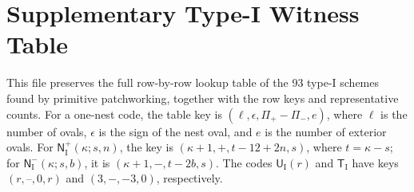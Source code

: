 \documentclass[10pt]{article}
\begin{document}
\raggedbottom
\section*{Supplementary Type-I Witness Table}
This file preserves the full row-by-row lookup table of the 93 type-I schemes found by primitive patchworking, together with the row keys and representative counts. For a one-nest code, the table key is $(\ell,\epsilon,\Pi_+-\Pi_-,e)$, where $\ell$ is the number of ovals, $\epsilon$ is the sign of the nest oval, and $e$ is the number of exterior ovals. For $\mathsf{N}_{\mathrm I}^{+}(\kappa;s,n)$, the key is $(\kappa+1,+,t-12+2n,s)$, where $t=\kappa-s$; for $\mathsf{N}_{\mathrm I}^{-}(\kappa;s,b)$, it is $(\kappa+1,-,t-2b,s)$. The codes $\mathsf U_{\mathrm I}(r)$ and $\mathsf T_{\mathrm I}$ have keys $(r,\text{--},0,r)$ and $(3,-,-3,0)$, respectively.
\small
\end{document}
